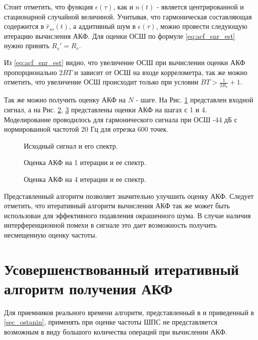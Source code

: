Стоит отметить, что функция ${\epsilon(\tau)}$, как и ${n(t)}$ - является центрированной и
стационарной случайной величиной.
Учитывая, что гармоническая составляющая содержится в ${\hat{r}_{ss}(t)}$, а аддитивный шум в ${\epsilon(\tau)}$, можно провести
следующую итерацию вычисления АКФ. Для оценки ОСШ по формуле \ref{eq:acf_snr_est} нужно принять ${R_s' = R_e}$.

Из \ref{eq:acf_snr_est} видно, что увеличение ОСШ при вычислении оценки АКФ пропорционально ${2BT}$ и зависит от
ОСШ на входе коррелометра, так же можно отметить, что увеличение ОСШ происходит только при условии ${BT > \frac{1}{2R_s} + 1}$.

Так же можно получить оценку АКФ на ${N}$ - шаге. На Рис. \ref{pic:acf_0_iter} представлен входной сигнал, а на
Рис. \ref{pic:acf_1_iter}, \ref{pic:acf_4_iter} представлены оценки АКФ на шагах с 1 и 4.
Моделирование проводилось для гармонического сигнала при ОСШ -44 дБ с нормированной частотой 20 Гц для
отрезка 600 точек.

\begin{figure}[h]
	\center{}
	\caption{Исходный сигнал и его спектр.}
	\label{pic:acf_0_iter}
\end{figure}

\begin{figure}[h]
	\center{}
	\caption{Оценка АКФ на 1 итерации и ее спектр.}
	\label{pic:acf_1_iter}
\end{figure}

\begin{figure}[h]
	\center{}
	\caption{Оценка АКФ на 4 итерации и ее спектр.}
	\label{pic:acf_4_iter}
\end{figure}

Представленный алгоритм позволяет значительно улучшить оценку АКФ. Следует отметить, что итеративный алгоритм вычисления АКФ так же
может быть использован для эффективного подавления окрашенного шума. В случае наличия интерференционной помехи в сигнале это дает
возможность получить несмещенную оценку частоты.

\section{Усовершенствованный итеративный алгоритм получения АКФ}
\label{sec_acf_fft}
Для приемников реального времени алгоритм, представленный в \cite{ostanin_akf} и приведенный в \ref{sec_ostanin}, применять при оценке 
частоты ШПС не представляется возможным в виду большого количества операций при вычислении АКФ.


